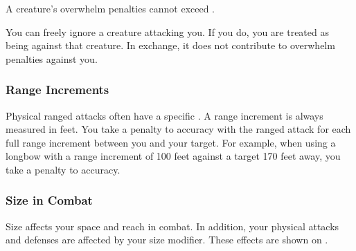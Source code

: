             A creature's overwhelm penalties cannot exceed .

             You can freely ignore a creature attacking you.
            If you do, you are treated as being \unaware against that creature.
            In exchange, it does not contribute to overwhelm penalties against you.

        \subsubsection{Range Increments}\label{Range Increments}
            Physical ranged attacks often have a specific .
            A range increment is always measured in feet.
            You take a  penalty to accuracy with the ranged attack for each full range increment between you and your target.
            For example, when using a longbow with a range increment of 100 feet against a target 170 feet away, you take a  penalty to accuracy.

        \subsubsection{Size in Combat}\label{Size in Combat}
            Size affects your space and reach in combat.
            In addition, your physical attacks and defenses are affected by your size modifier.
            These effects are shown on .

